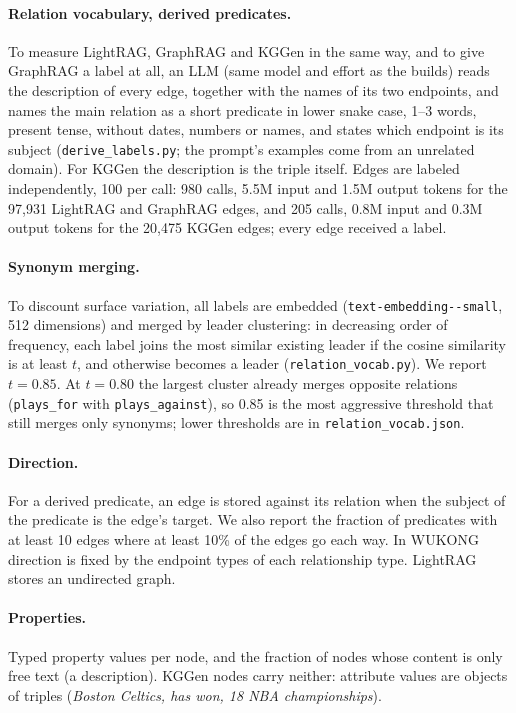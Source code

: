 \documentclass[11pt]{article}
\newcommand{\code}[1]{\texttt{#1}}
\newcommand{\wk}{WUKONG}
\begin{document}
\paragraph{Relation vocabulary, derived predicates.} To measure LightRAG, GraphRAG and KGGen in the
same way, and to give GraphRAG a label at all, an LLM (same model and effort as the builds) reads the
description of every edge, together with the names of its two endpoints, and names the main
relation as a short predicate in lower snake case, 1--3 words, present tense, without dates,
numbers or names, and states which endpoint is its subject (\code{derive\_labels.py}; the prompt's
examples come from an unrelated domain). For KGGen the description is the triple itself. Edges are
labeled independently, 100 per call: 980 calls, 5.5M input and 1.5M output tokens for the 97,931
LightRAG and GraphRAG edges, and 205 calls, 0.8M input and 0.3M output tokens for the 20,475 KGGen
edges; every edge received a label.

\paragraph{Synonym merging.} To discount surface variation, all labels are embedded
(\code{text-\allowbreak embedding--small}, 512 dimensions) and merged by leader
clustering: in decreasing order of frequency, each label joins the most similar existing leader if
the cosine similarity is at least $t$, and otherwise becomes a leader (\code{relation\_vocab.py}).
We report $t = 0.85$. At $t = 0.80$ the largest cluster already merges opposite relations
(\code{plays\_for} with \code{plays\_against}), so 0.85 is the most aggressive threshold that still
merges only synonyms; lower thresholds are in \code{relation\_vocab.json}.

\paragraph{Direction.} For a derived predicate, an edge is stored against its relation when the
subject of the predicate is the edge's target. We also report the fraction of predicates with at
least 10 edges where at least 10\% of the edges go each way. In \wk{} direction is fixed by the
endpoint types of each relationship type. LightRAG stores an undirected graph.

\paragraph{Properties.} Typed property values per node, and the fraction of nodes whose content is
only free text (a description). KGGen nodes carry neither: attribute values are objects of triples
(\emph{Boston Celtics, has won, 18 NBA championships}).
\end{document}
